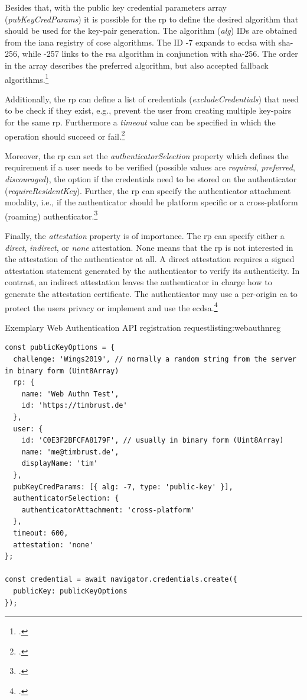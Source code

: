 Besides that, with the public key credential parameters array (\textit{pubKeyCredParams}) it is possible for the \gls{rp} to define the desired algorithm that should be used for the key-pair generation. The algorithm (\textit{alg}) IDs are obtained from the \gls{iana} registry of \gls{cose} algorithms. The ID -7 expands to \gls{ecdsa} with \gls{sha}-256, while -257 links to the \gls{rsa} algorithm in conjunction with \gls{sha}-256. The order in the array describes the preferred algorithm, but also accepted fallback algorithms.\footcites[See][Chapter 5.3, 11.3]{w3c}

Additionally, the \gls{rp} can define a list of credentials (\textit{excludeCredentials}) that need to be check if they exist, e.g., prevent the user from creating multiple key-pairs for the same \gls{rp}. Furthermore a \textit{timeout} value can be specified in which the operation should succeed or fail.\footcites[See][Chapter 5.4]{w3c}

Moreover, the \gls{rp} can set the \textit{authenticatorSelection} property which defines the requirement if a user needs to be verified (possible values are \textit{required}, \textit{preferred}, \textit{discouraged}), the option if the credentials need to be stored on the authenticator (\textit{requireResidentKey}). Further, the \gls{rp} can specify the authenticator attachment modality, i.e., if the authenticator should be platform specific or a cross-platform (roaming) authenticator.\footcites[See][Chapter 6.2.1]{w3c}

Finally, the \textit{attestation} property is of importance. The \gls{rp} can specify either a \textit{direct}, \textit{indirect}, or \textit{none} attestation. None means that the \gls{rp} is not interested in the attestation of the authenticator at all. A direct attestation requires a signed attestation statement generated by the authenticator to verify its authenticity. In contrast, an indirect attestation leaves the authenticator in charge how to generate the attestation certificate. The authenticator may use a per-origin \gls{ca} to protect the users privacy or implement and use the \gls{ecdsa}.\footcites[See][Chapter 5.4.6]{w3c}

\begin{example}{Exemplary Web Authentication API registration request}{listing:webauthnreg}
\begin{verbatim}
const publicKeyOptions = {
  challenge: 'Wings2019', // normally a random string from the server in binary form (Uint8Array)
  rp: {
    name: 'Web Authn Test',
    id: 'https://timbrust.de'
  },
  user: {
    id: 'C0E3F2BFCFA8179F', // usually in binary form (Uint8Array)
    name: 'me@timbrust.de',
    displayName: 'tim'
  },
  pubKeyCredParams: [{ alg: -7, type: 'public-key' }],
  authenticatorSelection: {
    authenticatorAttachment: 'cross-platform'
  },
  timeout: 600,
  attestation: 'none'
};

const credential = await navigator.credentials.create({
  publicKey: publicKeyOptions
});
\end{verbatim}
\end{example}

